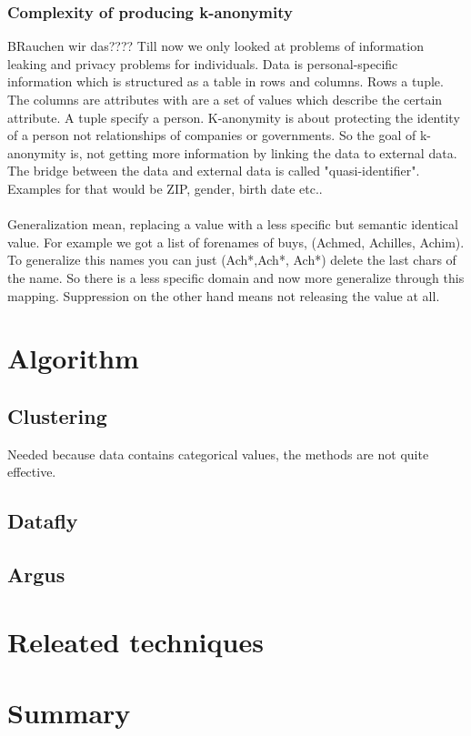 \documentclass{llncs}
\begin{document}
\subsubsection{Complexity of producing k-anonymity}
BRauchen wir das????
Till now we only looked at problems of information leaking and privacy problems for individuals. Data is personal-specific information which is structured as a table in rows and columns. Rows a tuple. The columns are attributes with are a set of values which describe the certain attribute. A tuple specify a person. K-anonymity is about protecting the identity of a person not relationships of companies or governments. So the goal of k-anonymity is, not getting more information by linking the data to external data. The bridge between the data and external data is called "quasi-identifier". Examples for that would be ZIP, gender, birth date etc.. \\
\\
Generalization mean, replacing a value with a less specific but semantic identical value. For example we got a list of forenames of buys, (Achmed, Achilles, Achim). To generalize this names you can just (Ach*,Ach*, Ach*) delete the last chars of the name. So there is a less specific domain and now more generalize through this mapping. Suppression on the other hand means not releasing the value at all.
\section{Algorithm}
\subsection{Clustering}
Needed because data contains categorical values, the methods are not quite effective.
\cite{li2006achieving}
\subsection{Datafly}
\subsection{Argus}
\section{Releated techniques}
\section{Summary}

\newpage


\end{document}
